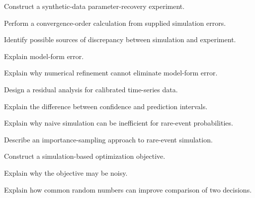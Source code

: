 \begin{exercise}[3]
Construct a synthetic-data parameter-recovery experiment.
\end{exercise}

\begin{exercise}[3]
Perform a convergence-order calculation from supplied simulation errors.
\end{exercise}

\begin{exercise}[3]
Identify possible sources of discrepancy between simulation and
experiment.
\end{exercise}

\begin{exercise}[3]
Explain model-form error.
\end{exercise}

\begin{exercise}[3]
Explain why numerical refinement cannot eliminate model-form error.
\end{exercise}

\begin{exercise}[3]
Design a residual analysis for calibrated time-series data.
\end{exercise}

\begin{exercise}[3]
Explain the difference between confidence and prediction intervals.
\end{exercise}

\begin{exercise}[3]
Explain why naive simulation can be inefficient for rare-event
probabilities.
\end{exercise}

\begin{exercise}[3]
Describe an importance-sampling approach to rare-event simulation.
\end{exercise}

\begin{exercise}[3]
Construct a simulation-based optimization objective.
\end{exercise}

\begin{exercise}[3]
Explain why the objective may be noisy.
\end{exercise}

\begin{exercise}[3]
Explain how common random numbers can improve comparison of two decisions.
\end{exercise}

